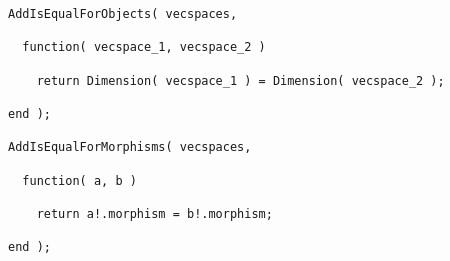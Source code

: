 \begin{small}
\begin{Verbatim}[frame=single]
AddIsEqualForObjects( vecspaces,
  
  function( vecspace_1, vecspace_2 )
    
    return Dimension( vecspace_1 ) = Dimension( vecspace_2 );
    
end );

AddIsEqualForMorphisms( vecspaces,

  function( a, b )
  
    return a!.morphism = b!.morphism;
  
end );
\end{Verbatim}
\end{small}